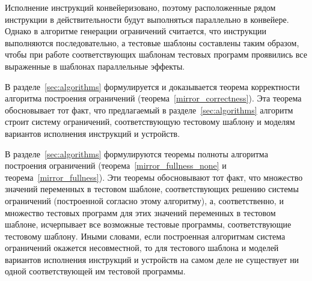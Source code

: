 Исполнение инструкций конвейеризовано, поэтому расположенные рядом инструкции в действительности будут выполняться параллельно в конвейере. Однако в алгоритме генерации ограничений считается, что инструкции выполняются последовательно, а тестовые шаблоны составлены таким образом, чтобы при работе соответствующих шаблонам тестовых программ проявились все выраженные в шаблонах параллельные эффекты.

В разделе~\ref{sec:algorithms} формулируется и доказывается теорема корректности алгоритма построения ограничений (теорема~\ref{mirror_correctness}). Эта теорема обосновывает тот факт, что предлагаемый в разделе~\ref{sec:algorithms} алгоритм строит систему ограничений, соответствующую тестовому шаблону и моделям вариантов исполнения инструкций и устройств.

В разделе~\ref{sec:algorithms} формулируются теоремы полноты алгоритма построения ограничений (теорема~\ref{mirror_fullness_none} и теорема~\ref{mirror_fullness}). Эти теоремы обосновывают тот факт, что множество значений переменных в тестовом шаблоне, соответствующих решению системы ограничений (построенной согласно этому алгоритму), а, соответственно, и множество тестовых программ для этих значений переменных в тестовом шаблоне, исчерпывает все возможные тестовые программы, соответствующие тестовому шаблону. Иными словами, если построенная алгоритмам система ограничений окажется несовместной, то для тестового шаблона и моделей вариантов исполнения инструкций и устройств на самом деле не существует ни одной соответствующей им тестовой программы.

